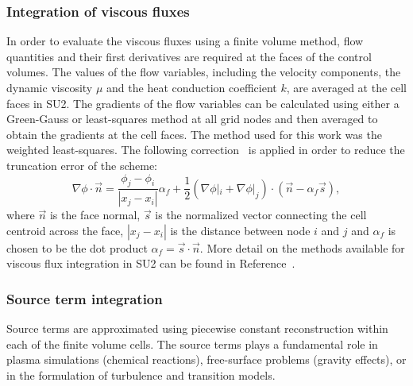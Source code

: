 \subsubsection*{Integration of viscous fluxes}

In order to evaluate the viscous fluxes using a finite volume method, flow quantities and their first derivatives are required at the faces of the control volumes. The values of the flow variables, including the velocity components, the dynamic viscosity $\mu$ and the heat conduction coefficient $k$, are averaged at the cell faces in SU2. The gradients of the flow variables can be calculated using either a Green-Gauss or least-squares method at all grid nodes and then averaged to obtain the gradients at the cell faces. The method used for this work was the weighted least-squares. The following correction~\cite{weiss1997} is applied in order to reduce the truncation error of the scheme:
\begin{equation}
\nabla \phi \cdot \vec n = \frac{\phi_{j}-\phi_i}{|x_{j}-x_i|}\alpha_f + \frac{1}{2}(\nabla \phi|_i + \nabla \phi|_j)\cdot(\vec n-\alpha_f \vec s),
\end{equation}
where $\vec {n}$ is the face normal, $\vec s$ is the normalized vector connecting the cell centroid across the face, $|x_{j}-x_i|$ is the distance between node $i$ and $j$ and $\alpha _f$ is chosen to be the dot product $\alpha_f = \vec s\cdot \vec {n}$. More detail on the methods available for viscous flux integration in SU2 can be found in Reference~. 
\subsubsection*{Source term integration}
Source terms are approximated using piecewise constant reconstruction within each of the finite volume cells. The source terms plays a fundamental role in plasma simulations (chemical reactions), free-surface problems (gravity effects), or in the formulation of turbulence and transition models.

